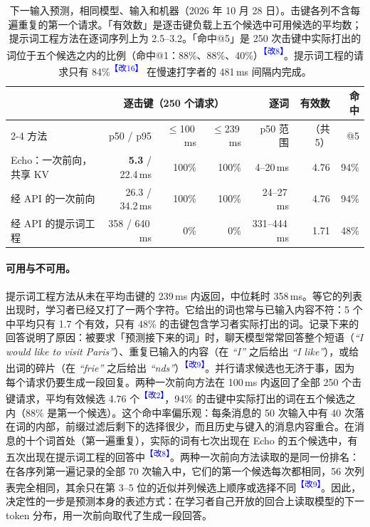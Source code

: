 \documentclass[11pt,a4paper,fontset=windows]{ctexart}
\newcommand{\audit}[1]{\textcolor{blue}{\textsuperscript{【改#1】}}}
\begin{document}
\begin{table}[ht]
\centering\footnotesize\setlength{\tabcolsep}{4pt}
\begin{tabular}{@{}lrrrrrr@{}}
\toprule
 & \multicolumn{3}{c}{逐击键（250 个请求）} & 逐词 & 有效数 & 命中\\
\cmidrule(lr){2-4}
方法 & p50 / p95 & $\le$100\,ms & $\le$239\,ms & p50 范围 & （共 5） & @5\\
\midrule
Echo：一次前向，共享 KV & \textbf{5.3} / 22.4\,ms & 100\% & 100\% & 4--20\,ms & 4.76 & 94\%\\
经 API 的一次前向 & 26.3 / 34.2\,ms & 100\% & 100\% & 24--27\,ms & 4.76 & 94\%\\
经 API 的提示词工程 & 358 / 640\,ms & 0\% & 0\% & 331--444\,ms & 1.71 & 48\%\\
\bottomrule
\end{tabular}
\caption{下一输入预测，相同模型、输入和机器（2026 年 10 月 28 日）。击键各列不含每遍重复的第一个请求。「有效数」是逐击键负载上五个候选中可用候选的平均数；提示词工程方法在逐词序列上为 2.5--3.2。「命中@5」是 250 次击键中实际打出的词位于五个候选之内的比例（命中@1：88\%、88\%、40\%）\audit{8}。提示词工程的请求只有 84\%\audit{16} 在慢速打字者的 481\,ms 间隔内完成。}
\label{tab:prediction}
\end{table}

\paragraph{可用与不可用。}提示词工程方法从未在平均击键的 239\,ms 内返回，中位耗时 358\,ms。等它的列表出现时，学习者已经又打了一两个字符。它给出的词也常与已输入内容不符：5 个中平均只有 1.7 个有效，只有 48\% 的击键包含学习者实际打出的词。记录下来的回答说明了原因：被要求「预测接下来的词」时，聊天模型常常回答整个短语（\emph{``I would like to visit Paris''}）、重复已输入的内容（在 \emph{``I''} 之后给出 \emph{``I like''}），或给出词的碎片（在 \emph{``frie''} 之后给出 \emph{``nds''}）\audit{9}。并行请求候选也无济于事，因为每个请求仍要生成一段回复。两种一次前向方法在 100\,ms 内返回了全部 250 个击键请求，平均有效候选 4.76 个\audit{2}，94\% 的击键中实际打出的词在五个候选之内（88\% 是第一个候选）。这个命中率偏乐观：每条消息的 50 次输入中有 40 次落在词的内部，前缀过滤后剩下的选择很少，而且历史与键入的消息内容重合。在消息的十个词首处（第一遍重复），实际的词有七次出现在 Echo 的五个候选中，有五次出现在提示词工程的回答中\audit{8}。两种一次前向方法读取的是同一份排名：在各序列第一遍记录的全部 70 次输入中，它们的第一个候选每次都相同，56 次列表完全相同，其余只在第 3--5 位的近似并列候选上顺序或选择不同\audit{9}。因此，决定性的一步是预测本身的表述方式：在学习者自己开放的回合上读取模型的下一 token 分布，用一次前向取代了生成一段回答。
\end{document}
